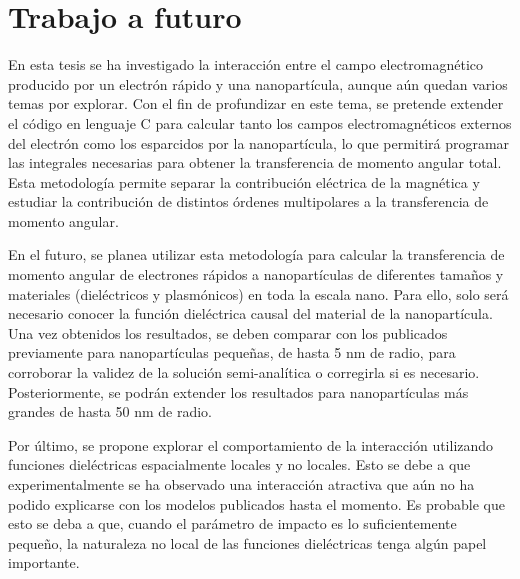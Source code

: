 \section{Trabajo a futuro}

En esta tesis se ha investigado la interacción entre el campo electromagnético producido por un electrón rápido y una nanopartícula, aunque aún quedan varios temas por explorar. Con el fin de profundizar en este tema, se pretende extender el código en lenguaje C para calcular tanto los campos electromagnéticos externos del electrón como los esparcidos por la nanopartícula, lo que permitirá programar las integrales necesarias para obtener la transferencia de momento angular total. Esta metodología permite separar la contribución eléctrica de la magnética y estudiar la contribución de distintos órdenes multipolares a la transferencia de momento angular.

En el futuro, se planea utilizar esta metodología para calcular la transferencia de momento angular de electrones rápidos a nanopartículas de diferentes tamaños y materiales (dieléctricos y plasmónicos) en toda la escala nano. Para ello, solo será necesario conocer la función dieléctrica causal del material de la nanopartícula. Una vez obtenidos los resultados, se deben comparar con los publicados previamente para nanopartículas pequeñas, de hasta 5 nm de radio, para corroborar la validez de la solución semi-analítica o corregirla si es necesario. Posteriormente, se podrán extender los resultados para nanopartículas más grandes de hasta 50 nm de radio.

Por último, se propone explorar el comportamiento de la interacción utilizando funciones dieléctricas espacialmente locales y no locales. Esto se debe a que experimentalmente se ha observado una interacción atractiva que aún no ha podido explicarse con los modelos publicados hasta el momento. Es probable que esto se deba a que, cuando el parámetro de impacto es lo suficientemente pequeño, la naturaleza no local de las funciones dieléctricas tenga algún papel importante.